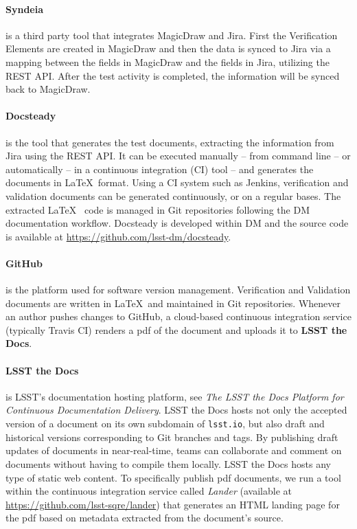\paragraph{Syndeia}
is a third party tool that integrates MagicDraw and Jira. 
First the Verification Elements are created in MagicDraw and then the data is synced to Jira
via a mapping between the fields in MagicDraw and the fields in Jira, utilizing the REST API.
After the test activity is completed, the information will be synced back to MagicDraw.

\paragraph{Docsteady}
is the tool that generates the test documents, extracting the information from Jira using the REST API.
It can be executed manually -- from command line -- or automatically -- in a continuous integration (CI) tool -- 
and generates the documents in \LaTeX~format.
Using a CI system such as Jenkins, verification and validation documents can be generated continuously, or on a regular bases.
The extracted \LaTeX~ code is managed in Git repositories following the  DM documentation workflow.
Docsteady is developed within DM and the source code is available at \url{https://github.com/lsst-dm/docsteady}.

\paragraph{GitHub}
is the platform used for software version management.
Verification and Validation documents are written in \LaTeX~and maintained in Git repositories.
Whenever an author pushes changes to GitHub, a cloud-based continuous integration service 
(typically Travis CI) renders a pdf of the document and uploads it to \textbf{LSST the Docs}.

\paragraph{LSST the Docs}
is LSST's documentation hosting platform, see \textit{The LSST the Docs Platform for Continuous Documentation Delivery}\cite{SQR-006}.
LSST the Docs hosts not only the accepted version of a document on its own subdomain of \texttt{lsst.io}, but also draft and
historical versions corresponding to Git branches and tags.
By publishing draft updates of documents in near-real-time, teams can collaborate and comment on documents without having to
compile them locally.
LSST the Docs hosts any type of static web content.
To specifically publish pdf documents, we run a tool within the continuous integration service called \textit{Lander}
(available at \url{https://github.com/lsst-sqre/lander})
that generates an HTML landing page for the pdf based on metadata extracted from the document's source.

